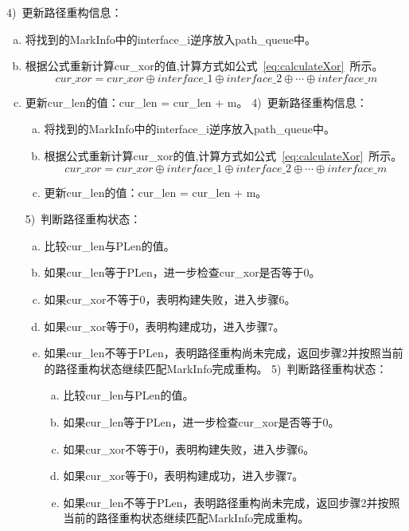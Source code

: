 \begin{enumerate}[a.]
\begin{enumerate}[a.]
\begin{enumerate}[a.]
\begin{enumerate}[a.]
\begin{enumerate}[a.]
4)~更新路径重构信息：\par
\begin{enumerate}[a.]
	\item 将找到的MarkInfo中的interface\_i逆序放入path\_queue中。
	\item 根据公式重新计算cur\_xor的值,计算方式如公式~\ref{eq:calculateXor}~所示。
	      \begin{equation}
		      \label{eq:calculateXor}
		      cur\_xor = cur\_xor \oplus interface\_1 \oplus interface\_2 \oplus \cdots \oplus interface\_m
	      \end{equation}
	\item 更新cur\_len的值：cur\_len = cur\_len + m。
4)~更新路径重构信息：\par
\begin{enumerate}[a.]
	\item 将找到的MarkInfo中的interface\_i逆序放入path\_queue中。
	\item 根据公式重新计算cur\_xor的值,计算方式如公式~\ref{eq:calculateXor}~所示。
	      \begin{equation}
		      \label{eq:calculateXor}
		      cur\_xor = cur\_xor \oplus interface\_1 \oplus interface\_2 \oplus \cdots \oplus interface\_m
	      \end{equation}
	\item 更新cur\_len的值：cur\_len = cur\_len + m。
\end{enumerate}

5)~判断路径重构状态：\par
\begin{enumerate}[a.]
	\item 比较cur\_len与PLen的值。
	\item 如果cur\_len等于PLen，进一步检查cur\_xor是否等于0。
	\item 如果cur\_xor不等于0，表明构建失败，进入步骤6。
	\item 如果cur\_xor等于0，表明构建成功，进入步骤7。
	\item 如果cur\_len不等于PLen，表明路径重构尚未完成，返回步骤2并按照当前的路径重构状态继续匹配MarkInfo完成重构。
5)~判断路径重构状态：\par
\begin{enumerate}[a.]
	\item 比较cur\_len与PLen的值。
	\item 如果cur\_len等于PLen，进一步检查cur\_xor是否等于0。
	\item 如果cur\_xor不等于0，表明构建失败，进入步骤6。
	\item 如果cur\_xor等于0，表明构建成功，进入步骤7。
	\item 如果cur\_len不等于PLen，表明路径重构尚未完成，返回步骤2并按照当前的路径重构状态继续匹配MarkInfo完成重构。
\end{enumerate}



\end{enumerate}
\end{enumerate}
\end{enumerate}
\end{enumerate}
\end{enumerate}
\end{enumerate}
\end{enumerate}

